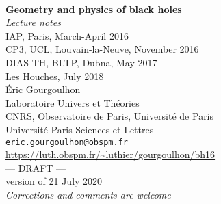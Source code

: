 \documentclass[12pt,a4paper]{book}
\begin{document}
\begin{titlepage}
\
\vspace{4cm}
\begin{center}
{\Huge\textbf{Geometry and physics of black holes}}\\[2ex]
{\Huge\emph{Lecture notes}}\\[3ex]
{\Large IAP, Paris, March-April 2016} \\[1ex]
{\Large CP3, UCL, Louvain-la-Neuve, November 2016}\\[1ex]
{\Large DIAS-TH, BLTP, Dubna, May 2017}\\[1ex]
{\Large Les Houches, July 2018}\\[8ex]
Éric Gourgoulhon \\
Laboratoire Univers et Théories \\
CNRS, Observatoire de Paris, Université de Paris\\
Université Paris Sciences et Lettres\\
\href{mailto:eric.gourgoulhon@obspm.fr}{\texttt{eric.gourgoulhon@obspm.fr}}\\[8ex]
\url{https://luth.obspm.fr/~luthier/gourgoulhon/bh16}\\[8ex]
{\Huge --- DRAFT ---}\\[2ex]
{version of 21 July 2020}\\[2ex]
\emph{\Large Corrections and comments are welcome}
\end{center}
\end{titlepage}


\dominitoc

\newpage


\tableofcontents








\end{document}
